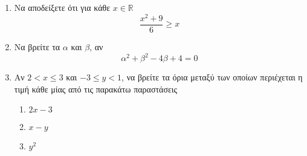 \documentclass[12pt]{extarticle}
\begin{document}
\renewcommand{\labelenumii}{\roman{enumii}.}

\part*{}
\noindent

\section*{}

\begin{enumerate}
    \item Να αποδείξετε ότι για κάθε $x\in\mathbb{R}$ $$\frac{x^2+9}{6}\ge x$$
    \hfill {}
    \item Να βρείτε τα $α$ και $β$, αν $$α^2+β^2-4β+4=0$$
    \hfill {}
    \item Αν $2<x\le 3$ και $-3\le y <1$, να βρείτε τα όρια μεταξύ των οποίων περιέχεται η τιμή κάθε μίας από τις παρακάτω παραστάσεις
    \begin{enumerate}
        \item $2x-3$
        \item $x-y$
        \item $y^2$
    \end{enumerate} 
    \hfill {}
\end{enumerate}
\end{document}
